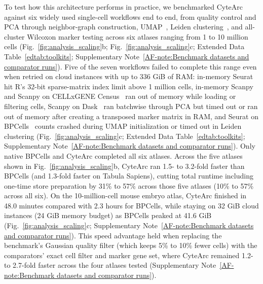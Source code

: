 \documentclass[11pt]{article}
\newcommand{\sref}[1]{\ref*{AF-#1}}
\begin{document}
To test how this architecture performs in practice, we benchmarked CyteArc against six widely used single-cell workflows end to end, from quality control and PCA through neighbor-graph construction, UMAP~\cite{mcinnes2018umap}, Leiden clustering~\cite{traag2019}, and all-cluster Wilcoxon marker testing across six atlases ranging from 1 to 10 million cells (Fig.~\ref{fig:analysis_scaling}b; Fig.~\ref{fig:analysis_scaling}c; Extended Data Table~\ref{edtab:toolkits}; Supplementary Note~\sref{note:Benchmark datasets and comparator runs}). Five of the seven workflows failed to complete this range even when retried on cloud instances with up to 336 GiB of RAM: in-memory Seurat~\cite{hao2024seurat} hit R's 32-bit sparse-matrix index limit above 1 million cells, in-memory Scanpy~\cite{wolf2018} and Scanpy on CELLxGENE Census~\cite{cellxgene2025} ran out of memory while loading or filtering cells, Scanpy on Dask~\cite{scanpydask} ran batchwise through PCA but timed out or ran out of memory after creating a transposed marker matrix in RAM, and Seurat on BPCells~\cite{parks2025bpcells} counts crashed during UMAP initialization or timed out in Leiden clustering (Fig.~\ref{fig:analysis_scaling}c; Extended Data Table~\ref{edtab:toolkits}; Supplementary Note~\sref{note:Benchmark datasets and comparator runs}). Only native BPCells and CyteArc completed all six atlases. Across the five atlases shown in Fig.~\ref{fig:analysis_scaling}b, CyteArc ran 1.5- to 3.2-fold faster than BPCells (and 1.3-fold faster on Tabula Sapiens), cutting total runtime including one-time store preparation by 31\% to 57\% across those five atlases (10\% to 57\% across all six). On the 10-million-cell mouse embryo atlas, CyteArc finished in 48.0 minutes compared with 2.3 hours for BPCells, while staying on 32 GiB cloud instances (24 GiB memory budget) as BPCells peaked at 41.6 GiB (Fig.~\ref{fig:analysis_scaling}c; Supplementary Note~\sref{note:Benchmark datasets and comparator runs}). This speed advantage held when replacing the benchmark's Gaussian quality filter (which keeps 5\% to 10\% fewer cells) with the comparators' exact cell filter and marker gene set, where CyteArc remained 1.2- to 2.7-fold faster across the four atlases tested (Supplementary Note~\sref{note:Benchmark datasets and comparator runs}).
\end{document}
